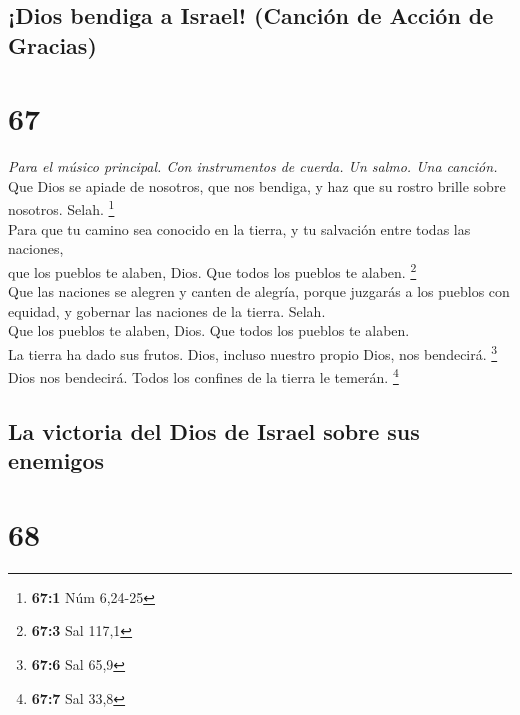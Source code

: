 \hypertarget{dios-bendiga-a-israel-canciuxf3n-de-acciuxf3n-de-gracias}{%
\subsection{¡Dios bendiga a Israel! (Canción de Acción de
Gracias)}\label{dios-bendiga-a-israel-canciuxf3n-de-acciuxf3n-de-gracias}}

\hypertarget{section-65}{%
\section{67}\label{section-65}}

\emph{Para el músico principal. Con instrumentos de cuerda. Un salmo.
Una canción.}\\
 Que Dios se apiade de nosotros, que nos bendiga, y haz
que su rostro brille sobre nosotros. Selah. \footnote{\textbf{67:1} Núm
  6,24-25}\\
 Para que tu camino sea conocido en la tierra, y tu
salvación entre todas las naciones,\\
 que los pueblos te alaben, Dios. Que todos los pueblos te
alaben. \footnote{\textbf{67:3} Sal 117,1}\\
 Que las naciones se alegren y canten de alegría, porque
juzgarás a los pueblos con equidad, y gobernar las naciones de la
tierra. Selah.\\
 Que los pueblos te alaben, Dios. Que todos los pueblos te
alaben.\\
 La tierra ha dado sus frutos. Dios, incluso nuestro
propio Dios, nos bendecirá. \footnote{\textbf{67:6} Sal 65,9}\\
 Dios nos bendecirá. Todos los confines de la tierra le
temerán. \footnote{\textbf{67:7} Sal 33,8}

\hypertarget{la-victoria-del-dios-de-israel-sobre-sus-enemigos}{%
\subsection{La victoria del Dios de Israel sobre sus
enemigos}\label{la-victoria-del-dios-de-israel-sobre-sus-enemigos}}

\hypertarget{section-66}{%
\section{68}\label{section-66}}


